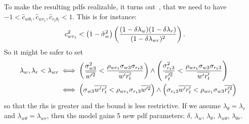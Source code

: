 To make the resulting \glspl{pdf} realizable, it turns out~\autocite{larson2022clubbsilhs}, that we need to have
$-1 < \widehat{c}_{w \theta_l}, \widehat{c}_{w r_t}, \widehat{c}_{r_t \theta_l} < 1$.
This is for instance:
\begin{align}
    c_{w r_t}^2 &< \left( 1 - \tilde{\sigma}_w^2 \right) \left(
    \frac{(1-\delta \lambda_w)(1-\delta \lambda_r)}{(1-\delta \lambda_{w r})^2}
    \right).
\end{align}
So it might be safer to set
\begin{align}
    \label{eq:lambda_corr_ineq}
    \lambda_w , \lambda_r < \lambda_{w r}
    &\iff
    \left(\frac{\sigma_{w 3}^2}{\overline{w'^2}} < \frac{\rho_{w r_t} \sigma_{w 3} \sigma_{r_t 3}}{\overline{w' r_t'}}\right)
    \land
    \left(\frac{\sigma_{r_t 3}^2}{\overline{r_t'^2}} < \frac{\rho_{w r_t} \sigma_{w 3} \sigma_{r_t 3}}{\overline{w' r_t'}}\right) \nonumber\\
    &\iff
    \left(\sigma_{w 3} \overline{w' r_t'} < \rho_{w r_t} \sigma_{r_t 3} \overline{w'^2}\right)
    \land
    \left(\sigma_{r_t 3} \overline{w' r_t'} < \rho_{w r_t} \sigma_{w 3} \overline{r_t'^2}\right) \nonumber\\
\end{align}
so that the \gls{rhs} is greater and the bound is less restrictive.
If we assume $\lambda_\theta = \lambda_r$ and $\lambda_{w\theta} = \lambda_{wr}$,
then the model gains 5 new \gls{pdf} parameters:
$\delta$, $\lambda_w$, $\lambda_\theta$, $\lambda_{w \theta}$, $\lambda_{\theta r}$.

